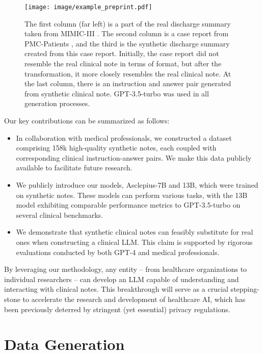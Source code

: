 \documentclass[11pt]{article}
\begin{document}
\begin{figure*}[!htbp]
\centering
\texttt{[image: image/example\_preprint.pdf]}
\caption{The first column (far left) is a part of the real discharge summary taken from MIMIC-III \citep{johnson2016mimic}. The second column is a case report from PMC-Patients \citep{zhao2023pmcpatients}, and the third is the synthetic discharge summary created from this case report. Initially, the case report did not resemble the real clinical note in terms of format, but after the transformation, it more closely resembles the real clinical note. At the last column, there is an instruction and answer pair generated from synthetic clinical note. GPT-3.5-turbo was used in all generation processes.}
\label{fig:example}
\end{figure*}

Our key contributions can be summarized as follows:
\begin{itemize}[leftmargin=4.5mm]

    \item In collaboration with medical professionals, we constructed a dataset comprising 158k high-quality synthetic notes, each coupled with corresponding clinical instruction-answer pairs. We make this data publicly available to facilitate future research.

    \item We publicly introduce our models, Asclepius-7B and 13B, which were trained on synthetic notes. These models can perform various tasks, with the 13B model exhibiting comparable performance metrics to GPT-3.5-turbo on several clinical benchmarks.

    \item We demonstrate that synthetic clinical notes can feasibly substitute for real ones when constructing a clinical LLM. This claim is supported by rigorous evaluations conducted by both GPT-4 and medical professionals.
\end{itemize}

By leveraging our methodology, any entity – from healthcare organizations to individual researchers – can develop an LLM capable of understanding and interacting with clinical notes. 
This breakthrough will serve as a crucial stepping-stone to accelerate the research and development of healthcare AI, which has been previously deterred by stringent (yet essential) privacy regulations.



\section{Data Generation}
\end{document}
